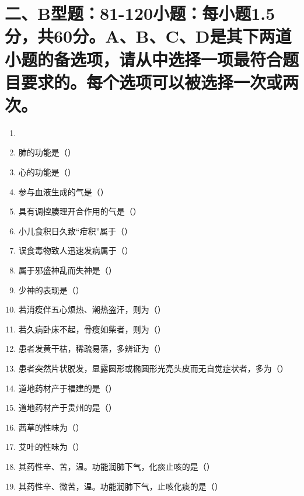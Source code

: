 \documentclass[a4paper,11pt]{ctexart}
\begin{document}
\section*{\large 二、B型题：81-120小题：每小题1.5分，共60分。A、B、C、D是其下两道小题的备选项，请从中选择一项最符合题目要求的。每个选项可以被选择一次或两次。}

\begin{enumerate}[resume]
      \item[]
      \item 肺的功能是（\quad）
      \item 心的功能是（\quad）
      \item 参与血液生成的气是（\quad）
      \item 具有调控腠理开合作用的气是（\quad）
      \item 小儿食积日久致“疳积”属于（\quad）
      \item 误食毒物致人迅速发病属于（\quad）
      \item 属于邪盛神乱而失神是（\quad）
      \item 少神的表现是（\quad）
      \item 若消瘦伴五心烦热、潮热盗汗，则为（\quad）
      \item 若久病卧床不起，骨瘦如柴者，则为（\quad）
      \item 患者发黄干枯，稀疏易落，多辨证为（\quad）
      \item 患者突然片状脱发，显露圆形或椭圆形光亮头皮而无自觉症状者，多为（\quad）
      \item 道地药材产于福建的是（\quad）
      \item 道地药材产于贵州的是（\quad）
      \item 茜草的性味为（\quad）
      \item 艾叶的性味为（\quad）
      \item 其药性辛、苦，温。功能润肺下气，化痰止咳的是（\quad）
      \item 其药性辛、微苦，温。功能润肺下气，止咳化痰的是（\quad）

\end{enumerate}
\end{document}
